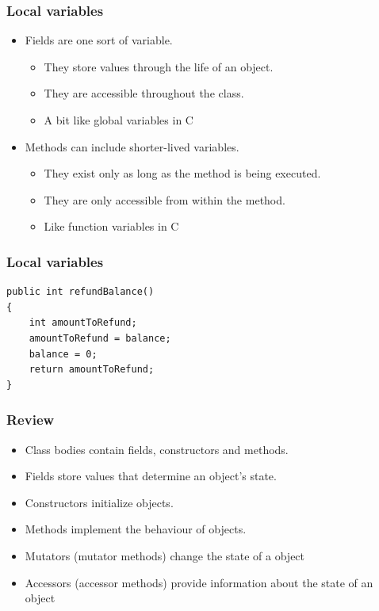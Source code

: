 \documentclass{beamer}
\begin{document}
\begin{frame}
\frametitle{Local variables}
\begin{itemize}
\item Fields are one sort of variable.
\begin{itemize}
\item They store values through the life of an object.
\item They are accessible throughout the class.
\item A bit like global variables in C
\end{itemize}
\item Methods can include shorter-lived variables.
\begin{itemize}
\item They exist only as long as the method is being executed.
\item They are only accessible from within the method.
\item Like function variables in C
\end{itemize}
\end{itemize}
\end{frame}

\begin{frame}[fragile]
\frametitle{Local variables}
\begin{lstlisting}
public int refundBalance()‏
{
    int amountToRefund;
    amountToRefund = balance;
    balance = 0;
    return amountToRefund;
} 
\end{lstlisting}
\end{frame}

\begin{frame}
\frametitle{Review}
\begin{itemize}
\item Class bodies contain fields, constructors and methods.
\item Fields store values that determine an object’s state.
\item Constructors initialize objects.
\item Methods implement the behaviour of objects.
\item Mutators (mutator methods) change the state of a object
\item Accessors (accessor methods) provide information about the state of an object 
\end{itemize}
\end{frame}
\end{document}
